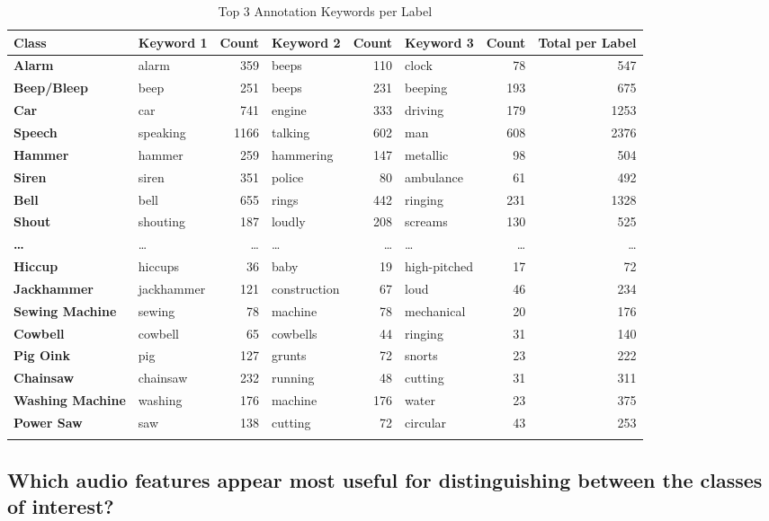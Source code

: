 \begin{table}[htbp]
\centering
\caption{Top 3 Annotation Keywords per Label}
\label{tab:keyword_summary_dots_count}
\begin{tabular}{l l r l r l r r}
\toprule
\textbf{Class} & \textbf{Keyword 1} & \textbf{Count} & \textbf{Keyword 2} & \textbf{Count} & \textbf{Keyword 3} & \textbf{Count} & \textbf{Total per Label} \\
\midrule
\textbf{Alarm} & alarm & 359 & beeps & 110 & clock & 78 & 547 \\
\textbf{Beep/Bleep} & beep & 251 & beeps & 231 & beeping & 193 & 675 \\
\textbf{Car} & car & 741 & engine & 333 & driving & 179 & 1253 \\
\textbf{Speech} & speaking & 1166 & talking & 602 & man & 608 & 2376 \\
\textbf{Hammer} & hammer & 259 & hammering & 147 & metallic & 98 & 504 \\
\textbf{Siren} & siren & 351 & police & 80 & ambulance & 61 & 492 \\
\textbf{Bell} & bell & 655 & rings & 442 & ringing & 231 & 1328 \\
\textbf{Shout} & shouting & 187 & loudly & 208 & screams & 130 & 525 \\
\midrule
\textbf{\dots} & \dots & \dots & \dots & \dots & \dots & \dots & \dots \\
\midrule
\textbf{Hiccup} & hiccups & 36 & baby & 19 & high-pitched & 17 & 72 \\
\textbf{Jackhammer} & jackhammer & 121 & construction & 67 & loud & 46 & 234 \\
\textbf{Sewing Machine} & sewing & 78 & machine & 78 & mechanical & 20 & 176 \\
\textbf{Cowbell} & cowbell & 65 & cowbells & 44 & ringing & 31 & 140 \\
\textbf{Pig Oink} & pig & 127 & grunts & 72 & snorts & 23 & 222 \\
\textbf{Chainsaw} & chainsaw & 232 & running & 48 & cutting & 31 & 311 \\
\textbf{Washing Machine} & washing & 176 & machine & 176 & water & 23 & 375 \\
\textbf{Power Saw} & saw & 138 & cutting & 72 & circular & 43 & 253 \\
\bottomrule
\label{tbl:1}
\end{tabular}
\end{table}



\subsection{Which audio features appear most useful for distinguishing between the classes of interest? }
\label{sec:Labeling Function:b}

